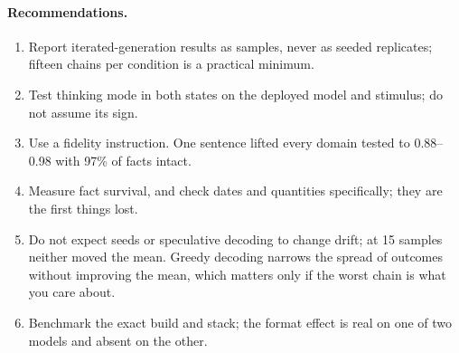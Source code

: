 \documentclass[11pt]{article}
\begin{document}
\paragraph{Recommendations.}
\begin{enumerate}[leftmargin=*]
  \item Report iterated-generation results as samples, never as seeded
        replicates; fifteen chains per condition is a practical minimum.
  \item Test thinking mode in both states on the deployed model and
        stimulus; do not assume its sign.
  \item Use a fidelity instruction. One sentence lifted every domain tested
        to 0.88--0.98 with 97\% of facts intact.
  \item Measure fact survival, and check dates and quantities specifically;
        they are the first things lost.
  \item Do not expect seeds or speculative decoding to change drift; at 15
        samples neither moved the mean. Greedy decoding narrows the spread of
        outcomes without improving the mean, which matters only if the
        worst chain is what you care about.
  \item Benchmark the exact build and stack; the format effect is real on
        one of two models and absent on the other.
\end{enumerate}
\end{document}
